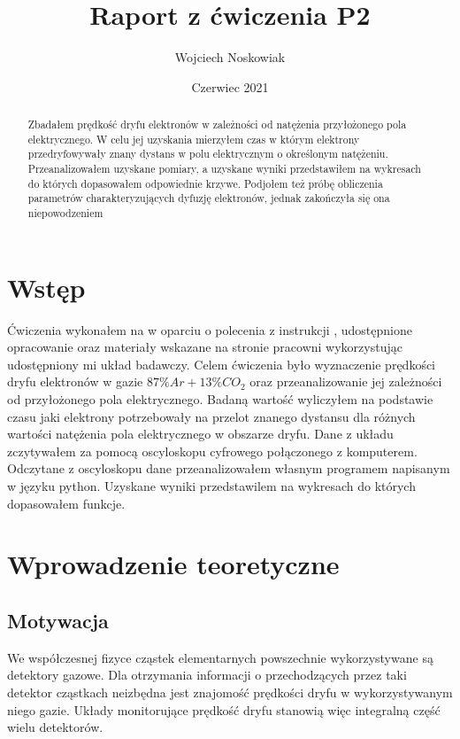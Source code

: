 \documentclass[10pt,a4paper]{article}
\author{Wojciech Noskowiak}
\title{Raport z ćwiczenia P2}
\date{Czerwiec 2021}
\begin{document}
\maketitle
\tableofcontents

\begin{abstract}
    Zbadałem prędkość dryfu elektronów w zależności od natężenia przyłożonego pola elektrycznego. W celu jej uzyskania mierzyłem czas w którym elektrony przedryfowywały znany dystans w polu elektrycznym o określonym natężeniu. Przeanalizowałem uzyskane pomiary, a uzyskane wyniki przedstawiłem na wykresach do których dopasowałem odpowiednie krzywe. Podjołem też próbę obliczenia parametrów charakteryzujących dyfuzję elektronów, jednak zakończyła się ona niepowodzeniem
\end{abstract}

\newpage

\section*{Wstęp}
Ćwiczenia wykonałem na w oparciu o polecenia z instrukcji \cite{instrukcja}, udostępnione opracowanie \cite{opracowanie} oraz materiały wskazane na stronie pracowni \cite{dyfuzja} \cite{detektory} wykorzystując udostępniony mi układ badawczy. Celem ćwiczenia było wyznaczenie prędkości dryfu elektronów w gazie $87\%Ar + 13\% CO_2$ oraz przeanalizowanie jej zależności od przyłożonego pola elektrycznego. Badaną wartość wyliczyłem na podstawie czasu jaki elektrony potrzebowały na przelot znanego dystansu dla różnych wartości natężenia pola elektrycznego w obszarze dryfu. Dane z układu zczytywałem za pomocą oscyloskopu cyfrowego połączonego z komputerem. Odczytane z oscyloskopu dane przeanalizowałem własnym programem napisanym w języku python. Uzyskane wyniki przedstawilem na wykresach do których dopasowałem funkcje.

\section{Wprowadzenie teoretyczne}

\subsection{Motywacja \cite{instrukcja}}

We współczesnej fizyce cząstek elementarnych powszechnie wykorzystywane są detektory gazowe. Dla otrzymania informacji o przechodzących przez taki detektor cząstkach neizbędna jest znajomość prędkości dryfu w wykorzystywanym niego gazie. Układy monitorujące prędkość dryfu stanowią więc integralną część wielu detektorów. 
\end{document}
